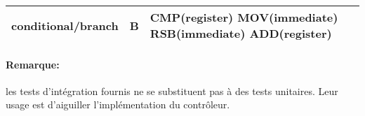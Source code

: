 \documentclass{article}
\begin{document}
\begin{tabularx}{\textwidth}{|l|X|X|}
        \hline
        conditional/branch                              & B                                                                                                                                 & CMP(register) \newline MOV(immediate) \newline RSB(immediate) \newline ADD(register) \\
        \hline
    \end{tabularx}

    \paragraph{Remarque:} les tests d'intégration fournis ne se substituent pas à des tests unitaires.
    Leur usage est d'aiguiller l'implémentation du contrôleur.
\end{document}
